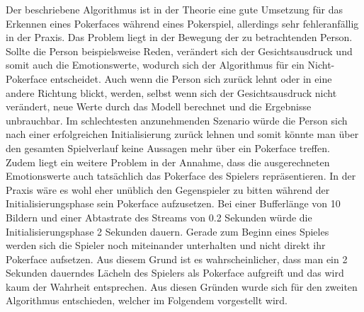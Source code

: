 \documentclass[12pt, a4paper]{report}
\begin{document}
\newline
Der beschriebene Algorithmus ist in der Theorie eine gute Umsetzung für das Erkennen eines Pokerfaces während eines Pokerspiel, allerdings sehr fehleranfällig in der Praxis. Das Problem liegt in der Bewegung der zu betrachtenden Person. Sollte die Person beispielsweise Reden, verändert sich der Gesichtsausdruck und somit auch die Emotionswerte, wodurch sich der Algorithmus für ein Nicht-Pokerface entscheidet. Auch wenn die Person sich zurück lehnt oder in eine andere Richtung blickt, werden, selbst wenn sich der Gesichtsausdruck nicht verändert, neue Werte durch das Modell berechnet und die Ergebnisse unbrauchbar. Im schlechtesten anzunehmenden Szenario würde die Person sich nach einer erfolgreichen Initialisierung zurück lehnen und somit könnte man über den gesamten Spielverlauf keine Aussagen mehr über ein Pokerface treffen. 
Zudem liegt ein weitere Problem in der Annahme, dass die ausgerechneten Emotionswerte auch tatsächlich das Pokerface des Spielers repräsentieren. In der Praxis wäre es wohl eher unüblich den Gegenspieler zu bitten während der Initialisierungsphase sein Pokerface aufzusetzen. Bei einer Bufferlänge von 10 Bildern und einer Abtastrate des Streams von 0.2 Sekunden würde die Initialisierungsphase 2 Sekunden dauern. Gerade zum Beginn eines Spieles werden sich die Spieler noch miteinander unterhalten und nicht direkt ihr Pokerface aufsetzen. Aus diesem Grund ist es wahrscheinlicher, dass man ein 2 Sekunden dauerndes Lächeln des Spielers als Pokerface aufgreift und das wird kaum der Wahrheit entsprechen.
Aus diesen Gründen wurde sich für den zweiten Algorithmus entschieden, welcher im Folgendem vorgestellt wird.
\end{document}
